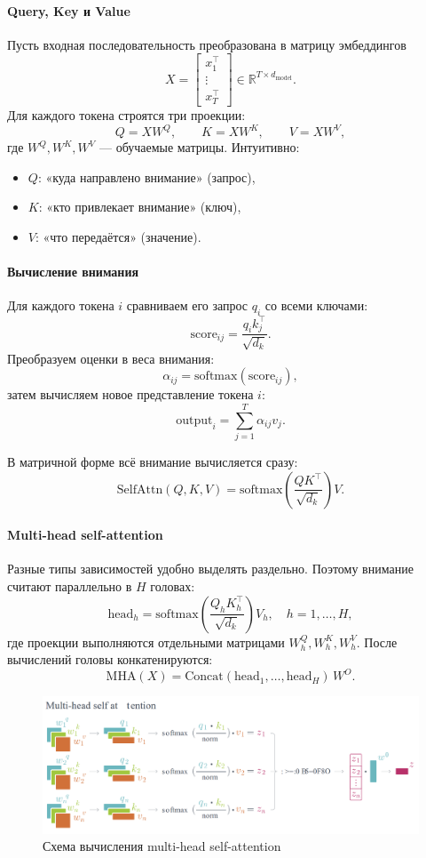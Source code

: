 \documentclass[12pt,a4paper]{article}
\begin{document}
\paragraph{Query, Key и Value}
Пусть входная последовательность преобразована в матрицу эмбеддингов
\[
X =
\begin{bmatrix}
x_1^\top \\
\vdots \\
x_T^\top
\end{bmatrix}
\in \mathbb{R}^{T \times d_{\text{model}}}.
\]
Для каждого токена строятся три проекции:
\[
Q = X W^Q,\qquad
K = X W^K,\qquad
V = X W^V,
\]
где $W^Q,W^K,W^V$ — обучаемые матрицы.
Интуитивно:
\begin{itemize}
\item $Q$: «куда направлено внимание» (запрос),
\item $K$: «кто привлекает внимание» (ключ),
\item $V$: «что передаётся» (значение).
\end{itemize}

\paragraph{Вычисление внимания}
Для каждого токена $i$ сравниваем его запрос $q_i$ со всеми ключами:
\[
\text{score}_{ij} = \frac{q_i k_j^\top}{\sqrt{d_k}}.
\]
Преобразуем оценки в веса внимания:
\[
\alpha_{ij} = \mathrm{softmax}(\text{score}_{ij}),
\]
затем вычисляем новое представление токена $i$:
\[
\text{output}_i = \sum_{j=1}^{T} \alpha_{ij} v_j.
\]

В матричной форме всё внимание вычисляется сразу:
\[
\mathrm{SelfAttn}(Q, K, V)
=
\mathrm{softmax}
\left(
\frac{QK^\top}{\sqrt{d_k}}
\right)V.
\]

\paragraph{Multi-head self-attention}
Разные типы зависимостей удобно выделять раздельно.
Поэтому внимание считают параллельно в $H$ головах:
\[
\mathrm{head}_h =
\mathrm{softmax}
\left(
\frac{Q_h K_h^\top}{\sqrt{d_k}}
\right)
V_h,
\quad h=1,\dots,H,
\]
где проекции выполняются отдельными матрицами $W_h^Q, W_h^K, W_h^V$.
После вычислений головы конкатенируются:
\[
\mathrm{MHA}(X) =
\mathrm{Concat}(\mathrm{head}_1,\dots,\mathrm{head}_H)\,W^O.
\]

\begin{figure}[h]
  \centering
  \includegraphics[width=0.70\linewidth]{MHA.png}
  \caption{Схема вычисления multi-head self-attention}
\end{figure}
\end{document}
